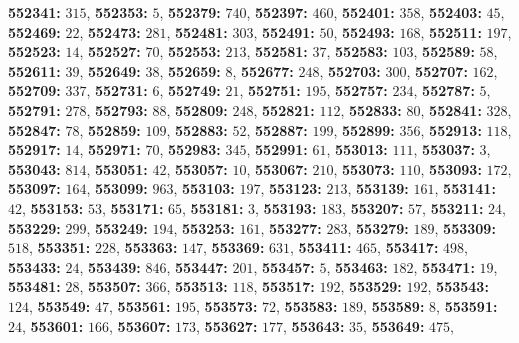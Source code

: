 \textsf{\bfseries 552341:} $315$, \textsf{\bfseries 552353:} $5$, \textsf{\bfseries 552379:} $740$, \textsf{\bfseries 552397:} $460$, \textsf{\bfseries 552401:} $358$, \textsf{\bfseries 552403:} $45$, \textsf{\bfseries 552469:} $22$, \textsf{\bfseries 552473:} $281$, \textsf{\bfseries 552481:} $303$, \textsf{\bfseries 552491:} $50$, \textsf{\bfseries 552493:} $168$, \textsf{\bfseries 552511:} $197$, \textsf{\bfseries 552523:} $14$, \textsf{\bfseries 552527:} $70$, \textsf{\bfseries 552553:} $213$, \textsf{\bfseries 552581:} $37$, \textsf{\bfseries 552583:} $103$, \textsf{\bfseries 552589:} $58$, \textsf{\bfseries 552611:} $39$, \textsf{\bfseries 552649:} $38$, \textsf{\bfseries 552659:} $8$, \textsf{\bfseries 552677:} $248$, \textsf{\bfseries 552703:} $300$, \textsf{\bfseries 552707:} $162$, \textsf{\bfseries 552709:} $337$, \textsf{\bfseries 552731:} $6$, \textsf{\bfseries 552749:} $21$, \textsf{\bfseries 552751:} $195$, \textsf{\bfseries 552757:} $234$, \textsf{\bfseries 552787:} $5$, \textsf{\bfseries 552791:} $278$, \textsf{\bfseries 552793:} $88$, \textsf{\bfseries 552809:} $248$, \textsf{\bfseries 552821:} $112$, \textsf{\bfseries 552833:} $80$, \textsf{\bfseries 552841:} $328$, \textsf{\bfseries 552847:} $78$, \textsf{\bfseries 552859:} $109$, \textsf{\bfseries 552883:} $52$, \textsf{\bfseries 552887:} $199$, \textsf{\bfseries 552899:} $356$, \textsf{\bfseries 552913:} $118$, \textsf{\bfseries 552917:} $14$, \textsf{\bfseries 552971:} $70$, \textsf{\bfseries 552983:} $345$, \textsf{\bfseries 552991:} $61$, \textsf{\bfseries 553013:} $111$, \textsf{\bfseries 553037:} $3$, \textsf{\bfseries 553043:} $814$, \textsf{\bfseries 553051:} $42$, \textsf{\bfseries 553057:} $10$, \textsf{\bfseries 553067:} $210$, \textsf{\bfseries 553073:} $110$, \textsf{\bfseries 553093:} $172$, \textsf{\bfseries 553097:} $164$, \textsf{\bfseries 553099:} $963$, \textsf{\bfseries 553103:} $197$, \textsf{\bfseries 553123:} $213$, \textsf{\bfseries 553139:} $161$, \textsf{\bfseries 553141:} $42$, \textsf{\bfseries 553153:} $53$, \textsf{\bfseries 553171:} $65$, \textsf{\bfseries 553181:} $3$, \textsf{\bfseries 553193:} $183$, \textsf{\bfseries 553207:} $57$, \textsf{\bfseries 553211:} $24$, \textsf{\bfseries 553229:} $299$, \textsf{\bfseries 553249:} $194$, \textsf{\bfseries 553253:} $161$, \textsf{\bfseries 553277:} $283$, \textsf{\bfseries 553279:} $189$, \textsf{\bfseries 553309:} $518$, \textsf{\bfseries 553351:} $228$, \textsf{\bfseries 553363:} $147$, \textsf{\bfseries 553369:} $631$, \textsf{\bfseries 553411:} $465$, \textsf{\bfseries 553417:} $498$, \textsf{\bfseries 553433:} $24$, \textsf{\bfseries 553439:} $846$, \textsf{\bfseries 553447:} $201$, \textsf{\bfseries 553457:} $5$, \textsf{\bfseries 553463:} $182$, \textsf{\bfseries 553471:} $19$, \textsf{\bfseries 553481:} $28$, \textsf{\bfseries 553507:} $366$, \textsf{\bfseries 553513:} $118$, \textsf{\bfseries 553517:} $192$, \textsf{\bfseries 553529:} $192$, \textsf{\bfseries 553543:} $124$, \textsf{\bfseries 553549:} $47$, \textsf{\bfseries 553561:} $195$, \textsf{\bfseries 553573:} $72$, \textsf{\bfseries 553583:} $189$, \textsf{\bfseries 553589:} $8$, \textsf{\bfseries 553591:} $24$, \textsf{\bfseries 553601:} $166$, \textsf{\bfseries 553607:} $173$, \textsf{\bfseries 553627:} $177$, \textsf{\bfseries 553643:} $35$, \textsf{\bfseries 553649:} $475$, 
